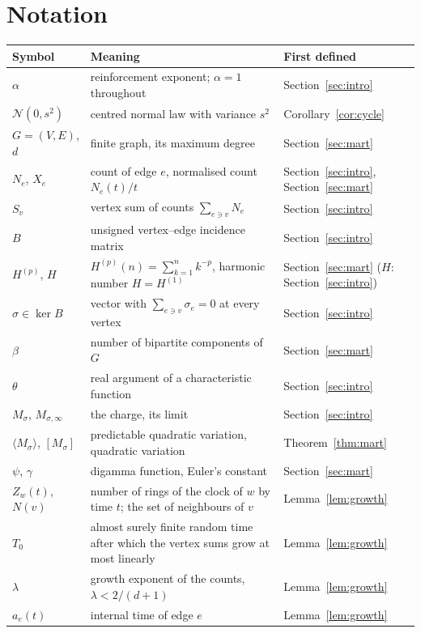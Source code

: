 \documentclass[11pt]{amsart}
\theoremstyle{remark}\newtheorem{remark}[theorem]{Remark}
\begin{document}
\section{Notation}
\begin{center}\scriptsize
\begin{tabular}{l p{5.6cm} p{2.5cm}}
\toprule
Symbol & Meaning & First defined\\
\midrule
$\alpha$ & reinforcement exponent; $\alpha=1$ throughout & Section~\ref{sec:intro}\\
$\mathcal{N}(0,s^2)$ & centred normal law with variance $s^2$ & Corollary~\ref{cor:cycle}\\
$G=(V,E)$, $d$ & finite graph, its maximum degree & Section~\ref{sec:mart}\\
$N_e$, $X_e$ & count of edge $e$, normalised count $N_e(t)/t$ & Section~\ref{sec:intro}, Section~\ref{sec:mart}\\
$S_v$ & vertex sum of counts $\sum_{e\ni v}N_e$ & Section~\ref{sec:intro}\\
$B$ & unsigned vertex--edge incidence matrix & Section~\ref{sec:intro}\\
$H^{(p)}$, $H$ & $H^{(p)}(n)=\sum_{k=1}^nk^{-p}$, harmonic number $H=H^{(1)}$ & Section~\ref{sec:mart} ($H$: Section~\ref{sec:intro})\\
$\sigma\in\ker B$ & vector with $\sum_{e\ni v}\sigma_e=0$ at every vertex & Section~\ref{sec:intro}\\
$\beta$ & number of bipartite components of $G$ & Section~\ref{sec:mart}\\
$\theta$ & real argument of a characteristic function & Section~\ref{sec:intro}\\
$M_\sigma$, $M_{\sigma,\infty}$ & the charge, its limit & Section~\ref{sec:intro}\\
$\langle M_\sigma\rangle$, $[M_\sigma]$ & predictable quadratic variation, quadratic variation & Theorem~\ref{thm:mart}\\
$\psi$, $\gamma$ & digamma function, Euler's constant & Section~\ref{sec:mart}\\
$Z_w(t)$, $N(v)$ & number of rings of the clock of $w$ by time $t$; the set of neighbours of $v$ & Lemma~\ref{lem:growth}\\
$T_0$ & almost surely finite random time after which the vertex sums grow at most linearly & Lemma~\ref{lem:growth}\\
$\lambda$ & growth exponent of the counts, $\lambda<2/(d+1)$ & Lemma~\ref{lem:growth}\\
$a_e(t)$ & internal time of edge $e$ & Lemma~\ref{lem:growth}\\

\end{tabular}
\end{center}
\end{document}
